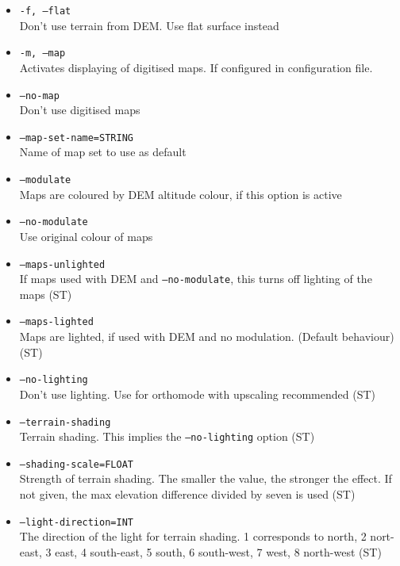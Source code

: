 \begin{itemize}
\item \texttt{-f, --flat} \\
Don't use terrain from DEM. Use flat surface instead

\item \texttt{-m, --map} \\
Activates displaying of digitised maps. If configured in configuration file.

\item \texttt{--no-map} \\
Don't use digitised maps

\item \texttt{--map-set-name=STRING} \\
Name of map set to use as default

\item \texttt{--modulate} \\
Maps are coloured by DEM altitude colour, if this option is active

\item \texttt{--no-modulate} \\
Use original colour of maps

\item \texttt{--maps-unlighted} \\
If maps used with DEM and \texttt{--no-modulate}, this turns off lighting of the maps (ST)

\item \texttt{--maps-lighted} \\
Maps are lighted, if used with DEM and no modulation. (Default behaviour) (ST)

\item \texttt{--no-lighting} \\
Don't use lighting. Use for orthomode with upscaling recommended (ST)

\item \texttt{--terrain-shading} \\
Terrain shading. This implies the \texttt{--no-lighting} option (ST)

\item \texttt{--shading-scale=FLOAT} \\
Strength of terrain shading. The smaller the value, the stronger the effect.
If not given, the max elevation difference divided by seven is used (ST)

\item \texttt{--light-direction=INT} \\
The direction of the light for terrain shading. 1 corresponds to north, 2 nort-east, 3 east, 4 south-east, 5 south,
6 south-west, 7 west, 8 north-west (ST)


\end{itemize}

